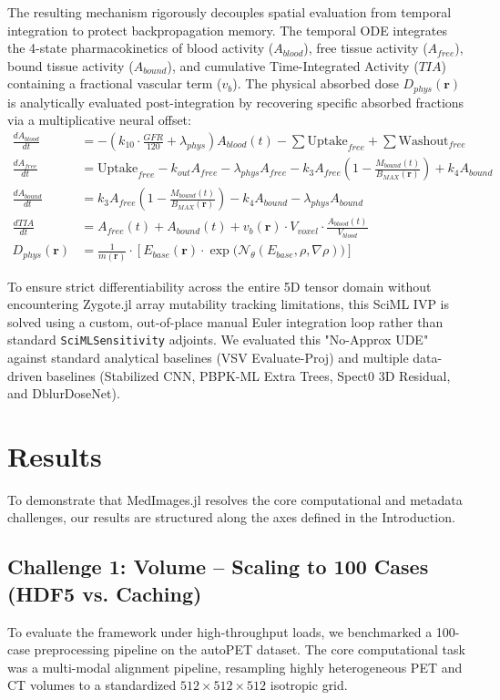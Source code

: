 \documentclass[10pt,letterpaper]{article}
\begin{document}
The resulting mechanism rigorously decouples spatial evaluation from temporal integration to protect backpropagation memory. The temporal ODE integrates the 4-state pharmacokinetics of blood activity ($A_{blood}$), free tissue activity ($A_{free}$), bound tissue activity ($A_{bound}$), and cumulative Time-Integrated Activity ($TIA$) containing a fractional vascular term ($v_b$). The physical absorbed dose $D_{phys}(\mathbf{r})$ is analytically evaluated post-integration by recovering specific absorbed fractions via a multiplicative neural offset:
\begin{align}
    \frac{dA_{blood}}{dt} &= -\left(k_{10} \cdot \frac{GFR}{120} + \lambda_{phys} \right) A_{blood}(t) - \sum \text{Uptake}_{free} + \sum \text{Washout}_{free} \\
    \frac{dA_{free}}{dt} &= \text{Uptake}_{free} - k_{out} A_{free} - \lambda_{phys} A_{free} - k_3 A_{free} \left( 1 - \frac{M_{bound}(t)}{B_{MAX}(\mathbf{r})} \right) + k_4 A_{bound} \\
    \frac{dA_{bound}}{dt} &= k_3 A_{free} \left( 1 - \frac{M_{bound}(t)}{B_{MAX}(\mathbf{r})} \right) - k_4 A_{bound} - \lambda_{phys} A_{bound} \\
    \frac{dTIA}{dt} &= A_{free}(t) + A_{bound}(t) + v_b(\mathbf{r}) \cdot V_{voxel} \cdot \frac{A_{blood}(t)}{V_{blood}} \\
    D_{phys}(\mathbf{r}) &= \frac{1}{m(\mathbf{r})} \cdot \left[ E_{base}(\mathbf{r}) \cdot \exp\Big(\mathcal{N}_\theta(E_{base}, \rho, \nabla \rho) \Big) \right]
\end{align}

To ensure strict differentiability across the entire 5D tensor domain without encountering Zygote.jl array mutability tracking limitations, this SciML IVP is solved using a custom, out-of-place manual Euler integration loop rather than standard \texttt{SciMLSensitivity} adjoints. We evaluated this "No-Approx UDE" against standard analytical baselines (VSV Evaluate-Proj) and multiple data-driven baselines (Stabilized CNN, PBPK-ML Extra Trees, Spect0 3D Residual, and DblurDoseNet).


\section{Results}
To demonstrate that MedImages.jl resolves the core computational and metadata challenges, our results are structured along the axes defined in the Introduction.

\subsection*{Challenge 1: Volume -- Scaling to 100 Cases (HDF5 vs. Caching)}
To evaluate the framework under high-throughput loads, we benchmarked a 100-case preprocessing pipeline on the autoPET dataset. The core computational task was a multi-modal alignment pipeline, resampling highly heterogeneous PET and CT volumes to a standardized $512 \times 512 \times 512$ isotropic grid. 
\end{document}
